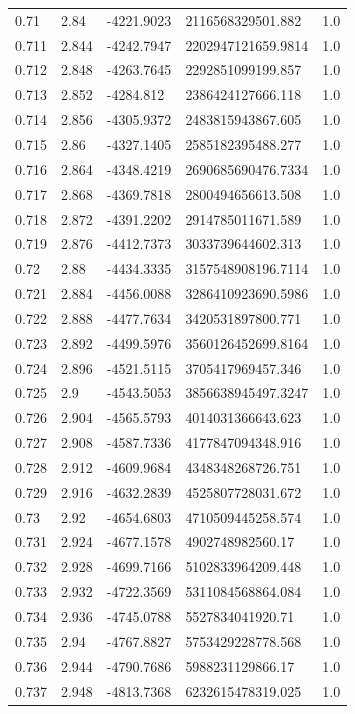 \begin{tabular}{lllll}
0.71 & 2.84 & -4221.9023 & 2116568329501.882 & 1.0 \\
0.711 & 2.844 & -4242.7947 & 2202947121659.9814 & 1.0 \\
0.712 & 2.848 & -4263.7645 & 2292851099199.857 & 1.0 \\
0.713 & 2.852 & -4284.812 & 2386424127666.118 & 1.0 \\
0.714 & 2.856 & -4305.9372 & 2483815943867.605 & 1.0 \\
0.715 & 2.86 & -4327.1405 & 2585182395488.277 & 1.0 \\
0.716 & 2.864 & -4348.4219 & 2690685690476.7334 & 1.0 \\
0.717 & 2.868 & -4369.7818 & 2800494656613.508 & 1.0 \\
0.718 & 2.872 & -4391.2202 & 2914785011671.589 & 1.0 \\
0.719 & 2.876 & -4412.7373 & 3033739644602.313 & 1.0 \\
0.72 & 2.88 & -4434.3335 & 3157548908196.7114 & 1.0 \\
0.721 & 2.884 & -4456.0088 & 3286410923690.5986 & 1.0 \\
0.722 & 2.888 & -4477.7634 & 3420531897800.771 & 1.0 \\
0.723 & 2.892 & -4499.5976 & 3560126452699.8164 & 1.0 \\
0.724 & 2.896 & -4521.5115 & 3705417969457.346 & 1.0 \\
0.725 & 2.9 & -4543.5053 & 3856638945497.3247 & 1.0 \\
0.726 & 2.904 & -4565.5793 & 4014031366643.623 & 1.0 \\
0.727 & 2.908 & -4587.7336 & 4177847094348.916 & 1.0 \\
0.728 & 2.912 & -4609.9684 & 4348348268726.751 & 1.0 \\
0.729 & 2.916 & -4632.2839 & 4525807728031.672 & 1.0 \\
0.73 & 2.92 & -4654.6803 & 4710509445258.574 & 1.0 \\
0.731 & 2.924 & -4677.1578 & 4902748982560.17 & 1.0 \\
0.732 & 2.928 & -4699.7166 & 5102833964209.448 & 1.0 \\
0.733 & 2.932 & -4722.3569 & 5311084568864.084 & 1.0 \\
0.734 & 2.936 & -4745.0788 & 5527834041920.71 & 1.0 \\
0.735 & 2.94 & -4767.8827 & 5753429228778.568 & 1.0 \\
0.736 & 2.944 & -4790.7686 & 5988231129866.17 & 1.0 \\
0.737 & 2.948 & -4813.7368 & 6232615478319.025 & 1.0 \\

\end{tabular}
